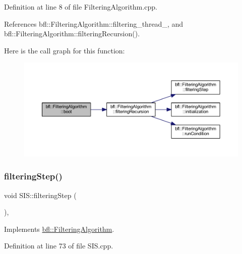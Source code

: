 Definition at line 8 of file Filtering\+Algorithm.\+cpp.



References bfl\+::\+Filtering\+Algorithm\+::filtering\+\_\+thread\+\_\+, and bfl\+::\+Filtering\+Algorithm\+::filtering\+Recursion().

Here is the call graph for this function\+:
\nopagebreak
\begin{figure}[H]
\begin{center}
\leavevmode
\includegraphics[width=350pt]{classbfl_1_1FilteringAlgorithm_a96651f8464190c0a56d79219a1017147_cgraph}
\end{center}
\end{figure}
\mbox{\label{classbfl_1_1SIS_a582f06cc5456d2cc6ed8f90087cbbb4c}} 
\subsubsection{\texorpdfstring{filtering\+Step()}{filteringStep()}}
{\footnotesize\ttfamily void S\+I\+S\+::filtering\+Step (\begin{DoxyParamCaption}{ }\end{DoxyParamCaption})\hspace{0.3cm}{\ttfamily [override]}, {\ttfamily [virtual]}}



Implements \mbox{\hyperlink{classbfl_1_1FilteringAlgorithm_ab3bceb43b5810a4bf1da884b8a0b145a}{bfl\+::\+Filtering\+Algorithm}}.



Definition at line 73 of file S\+I\+S.\+cpp.

\mbox{\label{classbfl_1_1FilteringAlgorithm_a8c43b1f3dac30934c0a03de348d4a29d}} 

